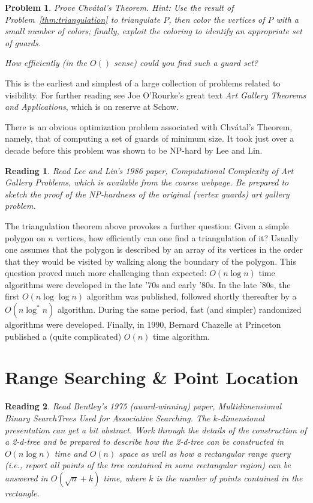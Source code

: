 \documentclass[11pt]{article}
\newtheorem{problem}{Problem}
\newtheorem{reading}{Reading}
\begin{document}
\begin{problem}
Prove Chv\'atal's Theorem. Hint: Use the result of Problem~\ref{thm:triangulation} to triangulate $P$, then color the
vertices of $P$ with a small number of colors; finally, exploit the coloring to identify an appropriate set of guards.

How efficiently (in the $O()$ sense) could you find such a guard set?
\end{problem}

This is the earliest and simplest of a large collection of problems related to visibility. For further reading see
Joe O'Rourke's great text {\em Art Gallery Theorems and Applications}, which is on reserve at Schow.

There is an obvious optimization problem associated with Chv\'atal's Theorem, namely, that of computing a set of
guards of minimum size.  It took just over a decade before this problem was shown to be NP-hard by Lee and Lin.

\begin{reading}
Read Lee and Lin's 1986 paper, {\em Computational Complexity of Art Gallery Problems}, which is available from the
course webpage.
Be prepared to sketch the proof of the NP-hardness of the original (vertex guards) art gallery problem.
\end{reading}

The triangulation theorem above provokes a further question: Given a simple polygon on $n$ vertices, how efficiently
can one find a triangulation of it?  Usually one assumes that the polygon is described by an array of its vertices in the order that they would be visited by walking along the boundary of the polygon.  This question proved much more
challenging than expected: $O(n \log n)$ time algorithms were developed in the late '70s and early '80s. In the late '80s,
the first $O(n \log \log n)$ algorithm was published, followed shortly thereafter by a $O(n \log^* n)$ algorithm. During the same period, fast (and simpler) randomized algorithms were developed.  Finally,
in 1990, Bernard Chazelle at Princeton published a (quite complicated) $O(n)$ time algorithm.

\section{Range Searching \& Point Location}
\begin{reading}
Read Bentley's 1975 (award-winning) paper, {\em Multidimensional Binary SearchTrees Used for Associative Searching}.
The $k$-dimensional presentation can get a bit abstract.  Work through the details of the construction of a 2-d-tree and
be prepared to describe how the 2-d-tree can be constructed in $O(n \log n)$ time and $O(n)$ space as well as how a
rectangular range query (i.e., report all points of the tree contained in some rectangular region) can be answered in
$O(\sqrt{n} + k)$ time, where $k$ is the number of points contained in the rectangle.
\end{reading}
\end{document}
